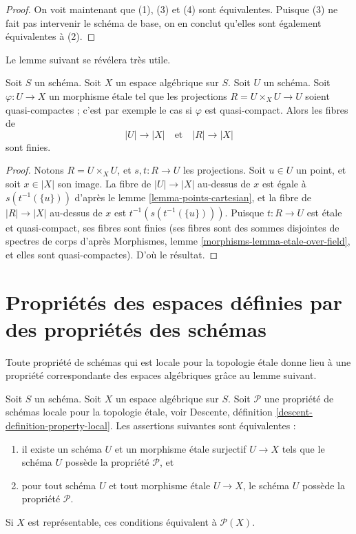 \begin{proof}
\medskip\noindent
On voit maintenant que (1), (3) et (4) sont équivalentes. Puisque (3) ne
fait pas intervenir le schéma de base, on en conclut qu'elles sont également équivalentes
à (2).
\end{proof}

\noindent
Le lemme suivant se révélera très utile.

\begin{lemma}
\label{lemma-finite-fibres-presentation}
Soit $S$ un schéma.
Soit $X$ un espace algébrique sur $S$.
Soit $U$ un schéma. Soit $\varphi : U \to X$ un morphisme étale tel que
les projections $R = U \times_X U \to U$ soient quasi-compactes ; c'est par exemple le cas si
$\varphi$ est quasi-compact. Alors les fibres de
$$
|U| \to |X|
\quad\text{et}\quad
|R| \to |X|
$$
sont finies.
\end{lemma}

\begin{proof}
Notons $R = U \times_X U$, et $s, t : R \to U$ les projections.
Soit $u \in U$ un point, et soit $x \in |X|$ son image.
La fibre de $|U| \to |X|$ au-dessus de $x$ est égale à
$s(t^{-1}(\{u\}))$ d'après le
lemme \ref{lemma-points-cartesian},
et la fibre de $|R| \to |X|$ au-dessus de $x$ est $t^{-1}(s(t^{-1}(\{u\})))$.
Puisque $t : R \to U$ est étale et quasi-compact, ses fibres sont finies
(ses fibres sont des sommes disjointes de spectres de corps d'après
Morphismes, lemme \ref{morphisms-lemma-etale-over-field},
et elles sont quasi-compactes). D'où le résultat.
\end{proof}








\section{Propriétés des espaces définies par des propriétés des schémas}
\label{section-types-properties}

\noindent
Toute propriété de schémas qui est locale pour la topologie \'etale donne lieu à une
propriété correspondante des espaces algébriques grâce au lemme suivant.

\begin{lemma}
\label{lemma-type-property}
Soit $S$ un schéma.
Soit $X$ un espace algébrique sur $S$.
Soit $\mathcal{P}$ une propriété de schémas locale pour la topologie \'etale,
voir
Descente, définition \ref{descent-definition-property-local}.
Les assertions suivantes sont équivalentes :
\begin{enumerate}
\item il existe un schéma $U$ et un morphisme \'etale surjectif $U \to X$
tels que le schéma $U$ possède la propriété $\mathcal{P}$, et
\item pour tout schéma $U$ et tout morphisme \'etale $U \to X$,
le schéma $U$ possède la propriété $\mathcal{P}$.
\end{enumerate}
Si $X$ est représentable, ces conditions équivalent à $\mathcal{P}(X)$.
\end{lemma}

